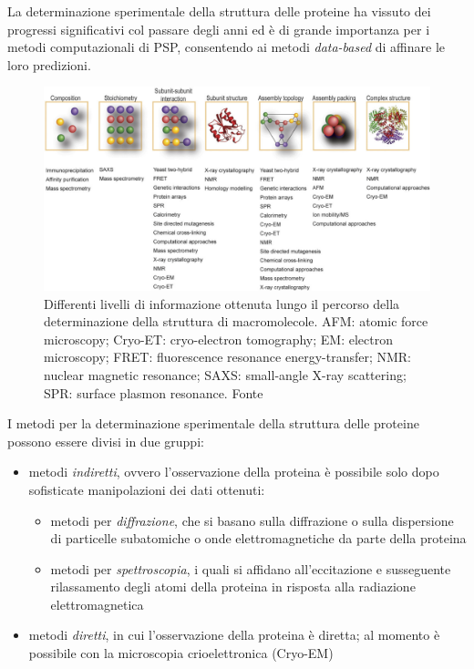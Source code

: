 {\par La determinazione sperimentale della struttura delle proteine ha vissuto dei progressi significativi col passare degli anni ed è di grande importanza per i metodi computazionali di PSP, consentendo ai metodi \textit{data-based} di affinare le loro predizioni.

\begin{figure}[!htb]
	\centering
	\includegraphics[scale=0.42]{images/metodi-sper2.png}
	\caption{Differenti livelli di informazione ottenuta lungo il percorso della determinazione della struttura di macromolecole. AFM: atomic force microscopy; Cryo-ET: cryo-electron tomography; EM: electron microscopy; FRET: fluorescence resonance energy-transfer; NMR: nuclear magnetic resonance; SAXS: small-angle X-ray scattering; SPR: surface plasmon resonance. Fonte\cite{sharon2011far}}
	\label{fig:metodi-sper2}
\end{figure}

I metodi per la determinazione sperimentale della struttura delle proteine possono essere divisi in due gruppi:
\begin{itemize}
	\item metodi \textit{indiretti}, ovvero l'osservazione della proteina è possibile solo dopo sofisticate manipolazioni dei dati ottenuti:
	\begin{itemize}
		\item metodi per \textit{diffrazione}, che si basano sulla diffrazione o sulla dispersione di particelle subatomiche o onde elettromagnetiche da parte della proteina
		\item metodi per \textit{spettroscopia}, i quali si affidano all'eccitazione e susseguente rilassamento degli atomi della proteina in risposta alla radiazione elettromagnetica
	\end{itemize}
	\item metodi \textit{diretti}, in cui l'osservazione della proteina è diretta; al momento è possibile con la microscopia crioelettronica (Cryo-EM)
\end{itemize}

}
